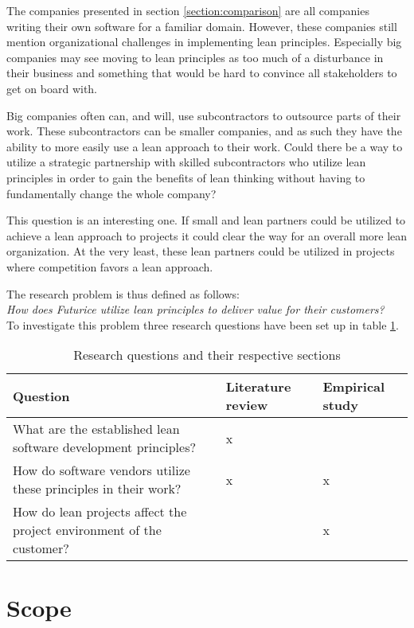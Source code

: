 The companies presented in section \ref{section:comparison} are all companies writing their own software for a familiar domain. However, these companies still mention organizational challenges in implementing lean principles. Especially big companies may see moving to lean principles as too much of a disturbance in their business and something that would be hard to convince all stakeholders to get on board with.

Big companies often can, and will, use subcontractors to outsource parts of their work. These subcontractors can be smaller companies, and as such they have the ability to more easily use a lean approach to their work. Could there be a way to utilize a strategic partnership with skilled subcontractors who utilize lean principles in order to gain the benefits of lean thinking without having to fundamentally change the whole company?

This question is an interesting one. If small and lean partners could be utilized to achieve a lean approach to projects it could clear the way for an overall more lean organization. At the very least, these lean partners could be utilized in projects where competition favors a lean approach.

The research problem is thus defined as follows:\\

\textit{How does Futurice utilize lean principles to deliver value for their customers?}\\

To investigate this problem three research questions have been set up in table \ref{tbl:questions}.


\begin{table}
  \begin{tabular}{p{200pt} | p{70pt} | p{70pt}}
    Question & Literature review & Empirical study \\
    \hline
    What are the established lean software development principles? & x & \\
    How do software vendors utilize these principles in their work? & x & x \\
    How do lean projects affect the project environment of the customer? &  & x \\
  \end{tabular}
  \caption{Research questions and their respective sections}
  \label{tbl:questions}
\end{table}

\section{Scope}
\label{section:scope}

